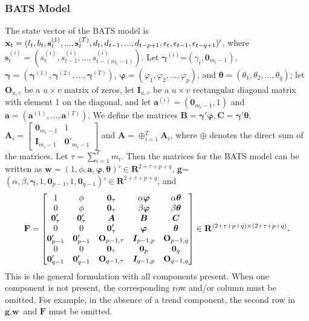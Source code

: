 \documentclass{uwstat572}
\newcommand{\vmadd}[1]{\textbf{\color{red}{#1}}}
\begin{document}
\subsubsection{BATS Model}
\hspace{4ex}The state vector of the BATS model is $\textbf{x}_t=(l_t,b_t,\textbf{s}_t^{(1)},...,\textbf{s}_t^{(T)}, d_t, d_{t-1},..., d_{t-p+1}, \epsilon_t, \epsilon_{t-1},\\ \epsilon_{t-q+1} )'$, 
where $\textbf{s}_t^{(i)}=(s_t^{(i)}, s_{t-1}^{(i)} ,..., s_{t-(m_i-1)}^{(i)}  )$. Let $\bm{\gamma}^{(i)}$=$(\gamma_i, \textbf{0}_{m_i-1})$, $\bm{\gamma}=(\bm{\gamma}^{(1)},\bm{\gamma}^{(2)},...,\bm{\gamma}^{(T)})$, $\bm{\varphi}=(\varphi_1, \varphi_2,..., \varphi_p)$, and $\bm{\theta}=(\theta_1,\theta_2,...,\theta_q)$; let $\textbf{O}_{u,v}$ be a $u \times v$ matrix of zeros, let $\textbf{I}_{u,v}$ be a $u \times v$ rectangular diagonal matrix with element 1 on the diagonal, and let $\textbf{a}^{(i)}=(\textbf{0}_{m_i-1},1)$ and $\textbf{a}=(\textbf{a}^{(1)},...,\textbf{a}^{(T)})$. We define the matrices $\textbf{B}=\bm{\gamma}'\bm{\varphi}, \textbf{C}=\bm{\gamma}'\bm{\theta}$, $\textbf{A}_i=\begin{bmatrix} 
\textbf{0}_{m_i-1} &1 \\ 
\textbf{I}_{m_i-1} & \textbf{0}'_{m_i-1} 
\end{bmatrix}$ and $\textbf{A}=\oplus _{i=1}^T \textbf{A}_i$, where $\oplus$ denotes the direct sum of the matrices. Let $\tau=\sum_{i=1}^{T} m_i$. 
Then the matrices for the BATS model can be written as $\textbf{w}=(1,\phi,\textbf{a}, \bm{\varphi}, \bm{\theta})' \in \mathbf{R}^{2+\tau+p+q}$, \textbf{g}=$(\alpha,\beta,\bm{\gamma}, 1, \textbf{0}_{p-1}, 1, \textbf{0}_{q-1})'\in \mathbf{R}^{2+\tau+p+q}$, and 
\[
\mathbf{F}=\begin{bmatrix} 
1 & \phi& \textbf{0}_\tau & \alpha \bm{\varphi} & \alpha \bm{\theta}  \\
0 & \phi& \textbf{0}_\tau & \beta \bm{\varphi} & \beta \bm{\theta}  \\
\textbf{0}'_\tau &  \textbf{0}'_\tau  & \bm{A} & \bm{B} & \bm{C} \\
0 & 0 & \textbf{0}'_\tau & \bm{\varphi} & \bm{\theta}  \\
\bm{0}'_{p-1} & \bm{0}'_{p-1} & \textbf{O}_{p-1,\tau} & \bm{I}_{p-1,p} &\textbf{O}_{p-1,q} \\
0 & 0 &\textbf{0}_\tau & \textbf{0}_p & \textbf{0}_q \\
\bm{0}'_{q-1} & \bm{0}'_{q-1} & \textbf{O}_{q-1,\tau} & \bm{I}_{q-1,p} &\textbf{O}_{q-1,q} \\
\end{bmatrix} \in \mathbf{R}^{(2+\tau+p+q) \times (2+\tau+p+q)}\vmadd{.}
\]
This is the general formulation with all components present. When one component is not present, the corresponding row and/or column must be omitted. For example, in the absence of a trend component, the second row in $\textbf{g}, \textbf{w}$ and $\textbf{F}$ must be omitted. 
\end{document}
